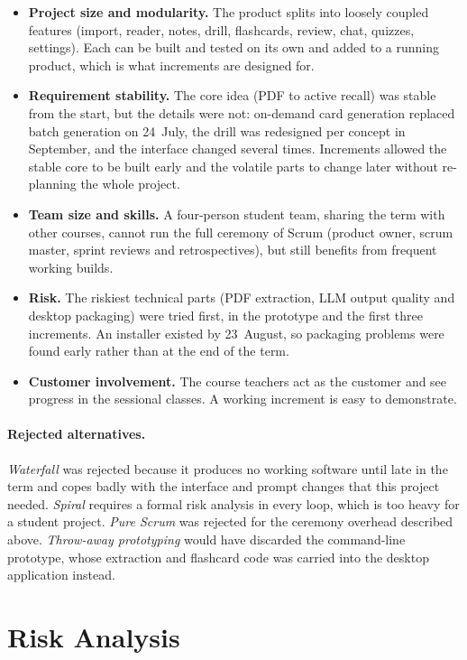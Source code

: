 \begin{itemize}
  \item \textbf{Project size and modularity.} The product splits into loosely coupled
  features (import, reader, notes, drill, flashcards, review, chat, quizzes, settings).
  Each can be built and tested on its own and added to a running product, which is what
  increments are designed for.
  \item \textbf{Requirement stability.} The core idea (PDF to active recall) was stable from
  the start, but the details were not: on-demand card generation replaced batch
  generation on 24~July, the drill was redesigned per concept in September, and the
  interface changed several times. Increments allowed the stable core to be built early and
  the volatile parts to change later without re-planning the whole project.
  \item \textbf{Team size and skills.} A four-person student team, sharing the term with
  other courses, cannot run the full ceremony of Scrum (product owner, scrum master, sprint
  reviews and retrospectives), but still benefits from frequent working builds.
  \item \textbf{Risk.} The riskiest technical parts (PDF extraction, LLM output quality and
  desktop packaging) were tried first, in the prototype and the first three increments. An
  installer existed by 23~August, so packaging problems were found early rather than at the
  end of the term.
  \item \textbf{Customer involvement.} The course teachers act as the customer and see progress
  in the sessional classes. A working increment is easy to demonstrate.
\end{itemize}

\paragraph{Rejected alternatives.} \emph{Waterfall} was rejected because it produces no
working software until late in the term and copes badly with the interface and prompt
changes that this project needed. \emph{Spiral} requires a formal risk analysis in every
loop, which is too heavy for a student project. \emph{Pure Scrum} was rejected for the
ceremony overhead described above. \emph{Throw-away prototyping} would have discarded the
command-line prototype, whose extraction and flashcard code was carried into the desktop
application instead.

\section{Risk Analysis}

